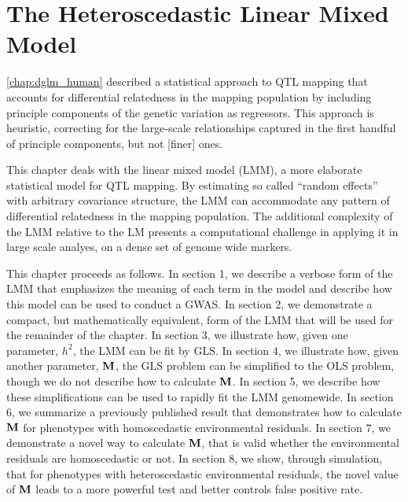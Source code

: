 \chapter{The Heteroscedastic Linear Mixed Model}
\label{chap:het_LMM}

\cref{chap:dglm_human} described a statistical approach to QTL mapping that accounts for differential relatedness in the mapping population by including principle components of the genetic variation as regressors.
This approach is heuristic, correcting for the large-scale relationships captured in the first handful of principle components, but not [finer] ones.

This chapter deals with the linear mixed model (LMM), a more elaborate statistical model for QTL mapping.
By estimating so called ``random effects'' with arbitrary covariance structure, the LMM can accommodate any pattern of differential relatedness in the mapping population.
The additional complexity of the LMM relative to the LM presents a computational challenge in applying it in large scale analyes, \eg on a dense set of genome wide markers.

This chapter proceeds as follows.
In section 1, we describe a verbose form of the LMM that emphasizes the meaning of each term in the model and describe how this model can be used to conduct a GWAS.
In section 2, we demonstrate a compact, but mathematically equivalent, form of the LMM that will be used for the remainder of the chapter.
In section 3, we illustrate how, given one parameter, $h^2$, the LMM can be fit by GLS.
In section 4, we illustrate how, given another parameter, $\mathbf{M}$, the GLS problem can be simplified to the OLS problem, though we do not describe how to calculate $\mathbf{M}$.
In section 5, we describe how these simplifications can be used to rapidly fit the LMM genomewide.
In section 6, we summarize a previously published result that demonstrates how to calculate $\mathbf{M}$ for phenotypes with homoscedastic environmental residuals.
In section 7, we demonstrate a novel way to calculate $\mathbf{M}$, that is valid whether the environmental residuals are homoscedastic or not.
In section 8, we show, through simulation, that for phenotypes with heteroscedastic environmental residuals, the novel value of $\mathbf{M}$ leads to a more powerful test and better controls false positive rate.



